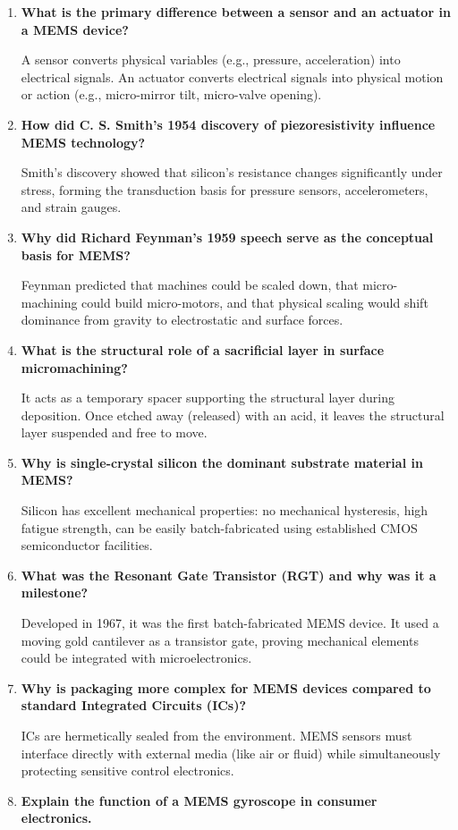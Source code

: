 \documentclass[12pt,a4paper]{article}
\newcommand{\Q}[1]{\textbf{#1}\par\noindent\ignorespaces}
\begin{document}
\begin{tcolorbox}[exambox, title={\textbf{Frequently Asked / Viva Questions}}]
\begin{enumerate}[topsep=0pt, label=\textbf{Q\arabic*.}, itemsep=5pt]
  \item \Q{What is the primary difference between a sensor and an actuator in a MEMS device?}
    A sensor converts physical variables (e.g., pressure, acceleration) into electrical signals. An actuator converts electrical signals into physical motion or action (e.g., micro-mirror tilt, micro-valve opening).
  \item \Q{How did C. S. Smith's 1954 discovery of piezoresistivity influence MEMS technology?}
    Smith's discovery showed that silicon's resistance changes significantly under stress, forming the transduction basis for pressure sensors, accelerometers, and strain gauges.
  \item \Q{Why did Richard Feynman's 1959 speech serve as the conceptual basis for MEMS?}
    Feynman predicted that machines could be scaled down, that micro-machining could build micro-motors, and that physical scaling would shift dominance from gravity to electrostatic and surface forces.
  \item \Q{What is the structural role of a sacrificial layer in surface micromachining?}
    It acts as a temporary spacer supporting the structural layer during deposition. Once etched away (released) with an acid, it leaves the structural layer suspended and free to move.
  \item \Q{Why is single-crystal silicon the dominant substrate material in MEMS?}
    Silicon has excellent mechanical properties: no mechanical hysteresis, high fatigue strength, can be easily batch-fabricated using established CMOS semiconductor facilities.
  \item \Q{What was the Resonant Gate Transistor (RGT) and why was it a milestone?}
    Developed in 1967, it was the first batch-fabricated MEMS device. It used a moving gold cantilever as a transistor gate, proving mechanical elements could be integrated with microelectronics.
  \item \Q{Why is packaging more complex for MEMS devices compared to standard Integrated Circuits (ICs)?}
    ICs are hermetically sealed from the environment. MEMS sensors must interface directly with external media (like air or fluid) while simultaneously protecting sensitive control electronics.
  \item \Q{Explain the function of a MEMS gyroscope in consumer electronics.}

\end{enumerate}
\end{tcolorbox}
\end{document}
